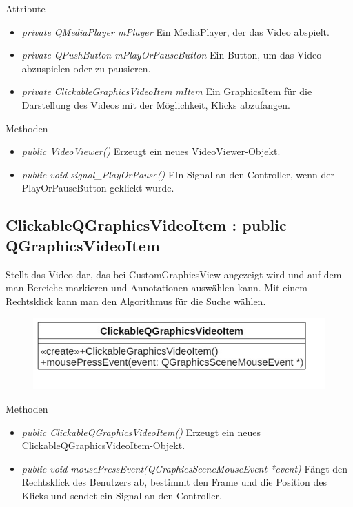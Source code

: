 Attribute
\begin{itemize}
	\item\textit{private QMediaPlayer mPlayer} 
	Ein MediaPlayer, der das Video abspielt. 
	\item\textit{private QPushButton mPlayOrPauseButton} 
	Ein Button, um das Video abzuspielen oder zu pausieren.
	\item\textit{private ClickableGraphicsVideoItem mItem} 
	Ein GraphicsItem für die Darstellung des Videos mit der Möglichkeit, Klicks abzufangen.     
\end{itemize}

Methoden
\begin{itemize}
	\item\textit{public VideoViewer()} 
	Erzeugt ein neues VideoViewer-Objekt.
	\item\textit{public void signal\_PlayOrPause()} 
	EIn Signal an den Controller, wenn der PlayOrPauseButton geklickt wurde.
\end{itemize} 

\subsection*{ClickableQGraphicsVideoItem : public QGraphicsVideoItem}
Stellt das Video dar, das bei CustomGraphicsView angezeigt wird und auf dem man Bereiche markieren und Annotationen auswählen kann. Mit einem Rechtsklick kann man den Algorithmus für die Suche wählen.

\begin{figure}[H]
	\centering
	\includegraphics[scale=0.5]{img/Klassendiagramm/Klassen/View/ClickableQGraphicsVideoItem}
	\label{fig:clickableQGraphicsVideoItem}
\end{figure}

Methoden
\begin{itemize}
	\item\textit{public ClickableQGraphicsVideoItem()} 
	Erzeugt ein neues ClickableQGraphicsVideoItem-Objekt.
	\item\textit{public void mousePressEvent(QGraphicsSceneMouseEvent *event)} 
	Fängt den Rechtsklick des Benutzers ab, bestimmt den Frame und die Position des Klicks und sendet ein Signal an den Controller.
\end{itemize}

